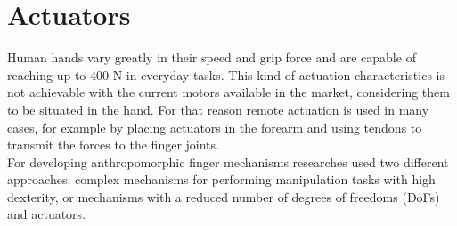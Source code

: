 \documentclass[a4paper, 10pt, conference]{ieeeconf}      %
\begin{document}
\section{\textbf{Actuators}}
Human hands vary greatly in their speed and grip force and are capable of reaching up to 400 N in everyday tasks. This kind of actuation characteristics is not achievable with the current motors available in the market, considering them to be situated in the hand. For that reason remote actuation is used in many cases, for example by placing actuators in the forearm and using tendons to transmit the forces to the finger joints.\\
For developing anthropomorphic finger mechanisms researches used two different approaches: complex mechanisms for performing manipulation tasks with high dexterity, or mechanisms with a reduced number of degrees of freedoms (DoFs) and actuators.\\
\end{document}
